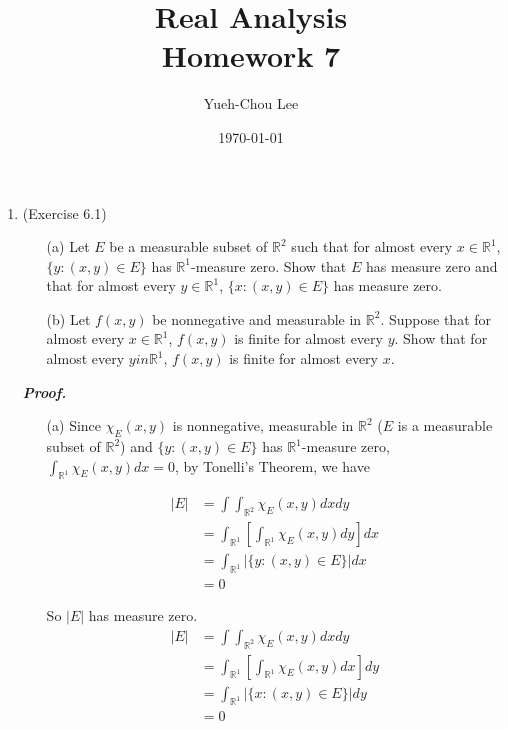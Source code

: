 \documentclass[a4paper,11pt]{article}
\title{Real Analysis \\ Homework 7}
\author{Yueh-Chou Lee}
\date{\today}
\begin{document}
\maketitle
 \begin{enumerate}
 	\item (Exercise 6.1)
 		\begin{enumerate}
 			\item [(a)] Let $E$ be a measurable subset of $\mathbb{R}^2$ such that for almost every $x \in \mathbb{R}^1$, $\{ y: (x,y) \in E \}$ has $\mathbb{R}^1$-measure zero. Show that $E$ has measure zero and that for almost every $y \in \mathbb{R}^1$, $\{x:(x,y) \in E \}$ has measure zero.

 			\item [(b)] Let $f(x,y)$ be nonnegative and measurable in $\mathbb{R}^2$. Suppose that for almost every $x \in \mathbb{R}^1$, $f(x,y)$ is finite for almost every $y$. Show that for almost every $y in \mathbb{R}^1$, $f(x,y)$ is finite for almost every $x$.\\
 		\end{enumerate}

 		\textit{\textbf {Proof.}}

 		\begin{enumerate}
 			\item [(a)] Since $\chi_E (x,y)$ is nonnegative, measurable in $\mathbb{R}^2$ ($E$ is a measurable subset of $\mathbb{R}^2$) and $\{ y : (x,y) \in E \}$ has $\mathbb{R}^1$-measure zero, $\int_{\mathbb{R}^1} \chi_E (x,y) dx = 0$, by Tonelli's Theorem, we have

 			$$\begin{aligned}
 			|E|
 			&= \int \int_{\mathbb{R}^2} \chi_E (x,y) dx dy\\
 			&= \int_{\mathbb{R}^1} \left[ \int_{\mathbb{R}^1} \chi_E (x,y) dy \right] dx\\
 			&= \int_{\mathbb{R}^1} \left| \{ y : (x,y) \in E \} \right| dx\\
 			&= 0
 			\end{aligned}$$

 			So $|E|$ has measure zero.\\

 			$$\begin{aligned}
 			|E|
 			&= \int \int_{\mathbb{R}^2} \chi_E (x,y) dx dy\\
 			&= \int_{\mathbb{R}^1} \left[ \int_{\mathbb{R}^1} \chi_E (x,y) dx \right] dy\\
 			&= \int_{\mathbb{R}^1} \left| \{ x : (x,y) \in E \} \right| dy\\
 			&= 0
 			\end{aligned}$$


\end{enumerate}
\end{enumerate}
\end{document}
